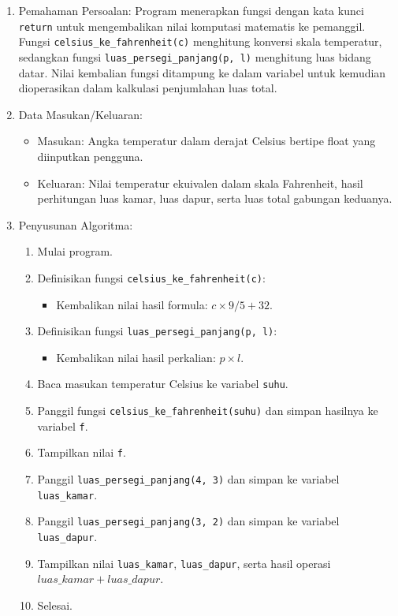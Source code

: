 \documentclass[12pt,a4paper]{article}
\begin{document}
\begin{enumerate}
    \item Pemahaman Persoalan: Program menerapkan fungsi dengan kata kunci \texttt{return} untuk mengembalikan nilai komputasi matematis ke pemanggil. Fungsi \texttt{celsius\_ke\_fahrenheit(c)} menghitung konversi skala temperatur, sedangkan fungsi \texttt{luas\_persegi\_panjang(p, l)} menghitung luas bidang datar. Nilai kembalian fungsi ditampung ke dalam variabel untuk kemudian dioperasikan dalam kalkulasi penjumlahan luas total.
    \item Data Masukan/Keluaran:
    \begin{itemize}
        \item Masukan: Angka temperatur dalam derajat Celsius bertipe float yang diinputkan pengguna.
        \item Keluaran: Nilai temperatur ekuivalen dalam skala Fahrenheit, hasil perhitungan luas kamar, luas dapur, serta luas total gabungan keduanya.
    \end{itemize}
    \item Penyusunan Algoritma:
    \begin{enumerate}[label=\alph*.]
        \item Mulai program.
        \item Definisikan fungsi \texttt{celsius\_ke\_fahrenheit(c)}:
        \begin{itemize}
            \item Kembalikan nilai hasil formula: $c \times 9 / 5 + 32$.
        \end{itemize}
        \item Definisikan fungsi \texttt{luas\_persegi\_panjang(p, l)}:
        \begin{itemize}
            \item Kembalikan nilai hasil perkalian: $p \times l$.
        \end{itemize}
        \item Baca masukan temperatur Celsius ke variabel \texttt{suhu}.
        \item Panggil fungsi \texttt{celsius\_ke\_fahrenheit(suhu)} dan simpan hasilnya ke variabel \texttt{f}.
        \item Tampilkan nilai \texttt{f}.
        \item Panggil \texttt{luas\_persegi\_panjang(4, 3)} dan simpan ke variabel \texttt{luas\_kamar}.
        \item Panggil \texttt{luas\_persegi\_panjang(3, 2)} dan simpan ke variabel \texttt{luas\_dapur}.
        \item Tampilkan nilai \texttt{luas\_kamar}, \texttt{luas\_dapur}, serta hasil operasi $luas\_kamar + luas\_dapur$.
        \item Selesai.
    \end{enumerate}
\end{enumerate}
\end{document}
